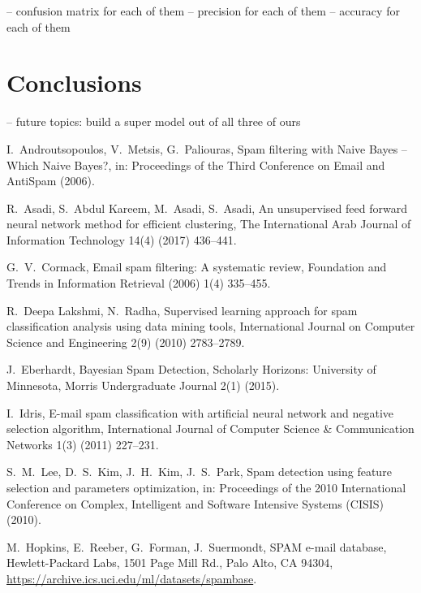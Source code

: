 \documentclass[11pt,a4paper]{article}
\begin{document}
-- confusion matrix for each of them
-- precision for each of them
-- accuracy for each of them

\section{Conclusions}

-- future topics: build a super model out of all three of ours


\begin{thebibliography}{99}
\begin{small}
  I.\ Androutsopoulos, V.\ Metsis, G.\ Paliouras,
  Spam filtering with Naive Bayes -- Which Naive Bayes?,
  in: Proceedings of the Third Conference on Email and AntiSpam (2006).

  R.\ Asadi, S.\ Abdul Kareem, M.\ Asadi, S.\ Asadi, 
  An unsupervised feed forward neural network method for efficient clustering,
  The International Arab Journal of Information Technology 14(4) (2017) 436--441.

  G.\ V.\ Cormack, 
  Email spam filtering: A systematic review,
  Foundation and Trends in Information Retrieval (2006) 1(4) 335--455.

  R.\ Deepa Lakshmi, N.\ Radha, 
  Supervised learning approach for spam classification analysis using data mining tools,
  International Journal on Computer Science and Engineering 2(9) (2010) 2783--2789.

  J.\ Eberhardt, 
  Bayesian Spam Detection,
  Scholarly Horizons: University of Minnesota, Morris Undergraduate Journal  2(1) (2015).

  I.\ Idris, 
  E-mail spam classification with artificial neural network and negative selection algorithm,
  International Journal of Computer Science \& Communication Networks 1(3) (2011) 227--231.

  S.\ M.\ Lee, D.\ S.\ Kim, J.\ H.\ Kim, J.\ S.\ Park, 
  Spam detection using feature selection and parameters optimization,
  in: Proceedings of the 2010 International Conference on Complex, Intelligent and Software Intensive Systems (CISIS) (2010).

  M.\ Hopkins, E.\ Reeber, G.\ Forman, J.\ Suermondt, 
  SPAM e-mail database,
  Hewlett-Packard Labs, 1501 Page Mill Rd., Palo Alto, CA 94304,
  \url{https://archive.ics.uci.edu/ml/datasets/spambase}.


\end{small}
\end{thebibliography}
\end{document}
